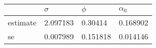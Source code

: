 \begin{tabular}{llll}
\toprule
{} &  $\sigma$ &    $\phi$ & $\alpha_0$ \\
\midrule
estimate &  2.097183 &   0.30414 &   0.168902 \\
se       &  0.007989 &  0.151818 &   0.014146 \\
\bottomrule
\end{tabular}
